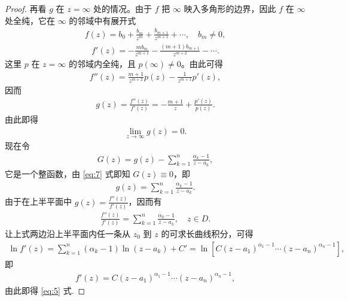 \documentclass[../../main.tex]{subfiles}%
\begin{document}
\begin{proof}
再看 \(g\) 在 \(z=\infty\) 处的情况。由于 \(f\) 把 \(\infty\) 映入多角形的边界，因此 \(f\) 在 \(\infty\) 处全纯，它在 \(\infty\) 的邻域中有展开式
\begin{align*}
f(z) = b_0 + \frac{b_m}{z^m} + \frac{b_{m+1}}{z^{m+1}} + \cdots, \quad b_m \neq 0,
\end{align*}
\begin{align*}
f'(z) = -\frac{m b_m}{z^{m+1}} - \frac{(m+1)b_{m+1}}{z^{m+2}} - \cdots.
\end{align*}
这里 \(p\) 在 \(z=\infty\) 的邻域内全纯，且 \(p(\infty) \neq 0\)。由此可得
\begin{align*}
f''(z) = \frac{m+1}{z^{m+2}} p(z) - \frac{1}{z^{m+1}} p'(z),
\end{align*}
因而
\begin{align*}
g(z) = \frac{f''(z)}{f'(z)} = -\frac{m+1}{z} + \frac{p'(z)}{p(z)}.
\end{align*}
由此即得
\begin{align}
\lim_{z \to \infty} g(z) = 0. \label{eq:7}
\end{align}
现在令
\begin{align*}
G(z) = g(z) - \sum\limits_{k=1}^{n} \frac{\alpha_k-1}{z-a_k},
\end{align*}
它是一个整函数，由 \eqref{eq:7} 式即知 \(G(z) \equiv 0\)，即
\begin{align*}
g(z) = \sum\limits_{k=1}^{n} \frac{\alpha_k-1}{z-a_k}.
\end{align*}
由于在上半平面中 \(g(z)=\frac{f''(z)}{f'(z)}\)，因而有
\begin{align*}
\frac{f''(z)}{f'(z)} = \sum\limits_{k=1}^{n} \frac{\alpha_k-1}{z-a_k}, \quad z \in D.
\end{align*}
让上式两边沿上半平面内任一条从 \(z_0\) 到 \(z\) 的可求长曲线积分，可得
\begin{align*}
\ln f'(z) = \sum\limits_{k=1}^{n} (\alpha_k-1) \ln(z-a_k) + C' = \ln \left[ C(z-a_1)^{\alpha_1-1} \cdots (z-a_n)^{\alpha_n-1} \right],
\end{align*}
即
\begin{align*}
f'(z) = C(z-a_1)^{\alpha_1-1} \cdots (z-a_n)^{\alpha_n-1},
\end{align*}
由此即得 \eqref{eq:5} 式.
\end{proof}
\end{document}
